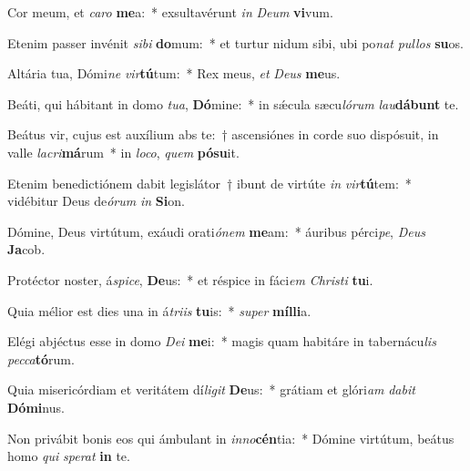 \item Cor meum, et \textit{ca}\textit{ro} \textbf{me}a:~* exsultavérunt \textit{in} \textit{De}\textit{um} \textbf{vi}vum.
\item Etenim passer invénit \textit{si}\textit{bi} \textbf{do}mum:~* et turtur nidum sibi, ubi po\textit{nat} \textit{pul}\textit{los} \textbf{su}os.
\item Altária tua, Dómi\textit{ne} \textit{vir}\textbf{tú}tum:~* Rex meus, \textit{et} \textit{De}\textit{us} \textbf{me}us.
\item Beáti, qui hábitant in domo \textit{tu}\textit{a}, \textbf{Dó}mine:~* in sǽcula sæcu\textit{ló}\textit{rum} \textit{lau}\textbf{dá}\textbf{bunt} te.
\item Beátus vir, cujus est auxílium abs te:~† ascensiónes in corde suo dispósuit, in valle \textit{la}\textit{cri}\textbf{má}rum~* in \textit{lo}\textit{co}, \textit{quem} \textbf{pó}\textbf{su}it.
\item Etenim benedictiónem dabit legislátor~† ibunt de virtúte \textit{in} \textit{vir}\textbf{tú}tem:~* vidébitur Deus de\textit{ó}\textit{rum} \textit{in} \textbf{Si}on.
\item Dómine, Deus virtútum, exáudi orati\textit{ó}\textit{nem} \textbf{me}am:~* áuribus pérci\textit{pe}, \textit{De}\textit{us} \textbf{Ja}cob.
\item Protéctor noster, á\textit{spi}\textit{ce}, \textbf{De}us:~* et réspice in fáci\textit{em} \textit{Chris}\textit{ti} \textbf{tu}i.
\item Quia mélior est dies una in á\textit{tri}\textit{is} \textbf{tu}is:~* \textit{su}\textit{per} \textbf{míl}\textbf{li}a.
\item Elégi abjéctus esse in domo \textit{De}\textit{i} \textbf{me}i:~* magis quam habitáre in tabernácu\textit{lis} \textit{pec}\textit{ca}\textbf{tó}rum.
\item Quia misericórdiam et veritátem dí\textit{li}\textit{git} \textbf{De}us:~* grátiam et glóri\textit{am} \textit{da}\textit{bit} \textbf{Dó}\textbf{mi}nus.
\item Non privábit bonis eos qui ámbulant in \textit{in}\textit{no}\textbf{cén}tia:~* Dómine virtútum, beátus homo \textit{qui} \textit{spe}\textit{rat} \textbf{in} te.
